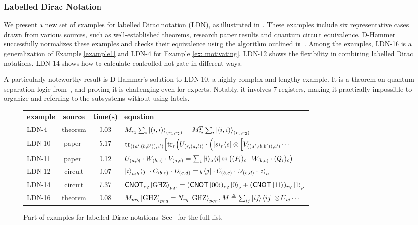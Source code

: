 \subsubsection{Labelled Dirac Notation}
We present a new set of examples for labelled Dirac notation (LDN), as illustrated in~. These examples include six representative cases drawn from various sources, such as well-established theorems, research paper results and quantum circuit equivalence.
D-Hammer successfully normalizes these examples and checks their equivalence using the algorithm outlined in~.
Among the examples, LDN-16 is a generalization of Example \ref{example1} and LDN-4 for Example \ref{ex: motivating}. LDN-12 shows the flexibility in combining labelled Dirac notations.
LDN-14 shows how to calculate controlled-not gate in different ways. 

A particularly noteworthy result is D-Hammer's solution to LDN-10, a highly complex and lengthy example. It is a theorem on quantum separation logic from~\cite{DBLP:conf/lics/ZhouBHYY21}, and proving it is challenging even for experts. Notably, it involves 7 registers, making it practically impossible to organize and referring to the subsystems without using labels.

\begin{figure}[h]
    \center
    \setlength{\extrarowheight}{2pt}
    \begin{tabular}{l c c l}
        \hline
        example & source & time(s) & equation \\
        \hline
        LDN-4 & theorem & 0.03 & \( M_{r_1}\sum_{i}\ket{(i,i)}_{(r_1,r_2)} = M^T_{r_2}\sum_{i}\ket{(i,i)}_{(r_1, r_2)} \)\\
        LDN-10 & paper~\cite{DBLP:conf/lics/ZhouBHYY21} & 5.17 & \( \mathrm{tr}_{((a',(b,b')),c')}\Big[\mathrm{tr}_{r}\Big(U_{(r,(a,b))} \cdot\Big(|s\rangle_r\langle s|\otimes 
        \Big[V_{((a',(b,b')),c')} \cdots \)\\
        LDN-11 & paper~\cite{PALSBERG2024206} & 0.12 & \( U_{(a,b)}\cdot W_{(b,c)}\cdot V_{(a,c)} = 
        \sum_i |i\rangle_a\langle i|\otimes \big((P_i)_c\cdot W_{(b,c)}\cdot (Q_i)_c\big)\) \\
        LDN-12 & circuit & 0.07 & \( \ket{i}_{a;b}\bra{j} \cdot C_{(b,c)} \cdot D_{(c,d)} = {}_b\bra{j} \cdot C_{(b,c)} \cdot D_{(c,d)} \cdot \ket{i}_{a}\) \\
        LDN-14 & circuit & 7.37 & \scriptsize{\( \textsf{CNOT}_{rq}\ket{\textrm{GHZ}}_{pqr} = (\textsf{CNOT}\ket{00})_{rq}\ket{0}_p + (\textsf{CNOT}\ket{11})_{rq}\ket{1}_p \)} \\
        LDN-16 & theorem & 0.08 & \scriptsize{\( M_{prq}\ket{\textrm{GHZ}}_{prq} = N_{rq} \ket{\textrm{GHZ}}_{pqr}, M \triangleq \sum_{ij}\ket{ij}\bra{ij}\otimes U_{ij} \cdots \)} \\
        \hline
    \end{tabular}
    \caption{Part of examples for labelled Dirac notations. See~ for the full list.}
    \vspace{-0.2cm}
    \label{fig: labelled examples}
\end{figure}

